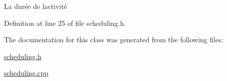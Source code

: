 La durée de l\textquotesingle{}activité 



Definition at line 25 of file scheduling.\+h.



The documentation for this class was generated from the following files\+:\begin{DoxyCompactItemize}
\item 
\hyperlink{scheduling_8h}{scheduling.\+h}\item 
\hyperlink{scheduling_8cpp}{scheduling.\+cpp}\end{DoxyCompactItemize}
